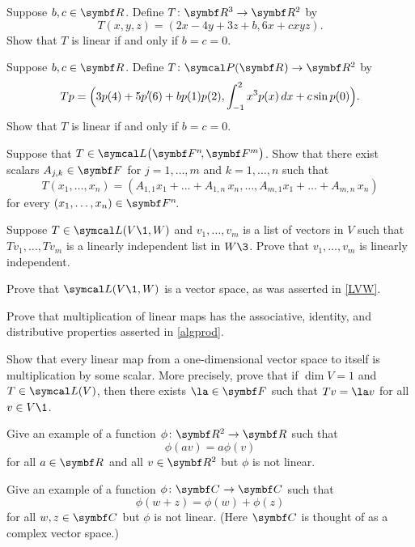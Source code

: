 \begin{exercises}

\exercise
Suppose $b, c \in \R{}$. Define $T \colon \R3 \to \R2$ by
\[
T(x, y, z) = (2x -4y + 3z + b, 6x + c xyz).
\]
Show that $T$ is linear if and only if $b = c = 0$.


\exercise
Suppose $b, c \in \R{}$. Define $T \colon \P(\R{}) \to \R2$ by
\[
Tp = \Bigl(3p(4) + 5p' \! (6) + b p(1) p(2), \int_{-1}^2 x^3 p(x)\, dx + c \sin p(0)\Bigr).
\]
Show that $T$ is linear if and only if $b = c = 0$.


\exercise
Suppose that $T \in \L\paren[\big]{\FF{n}, \F{m}}$.  Show that there exist scalars $A_{j, k} \in \F{}$ for $j = 1, \dots, m$ and $k = 1, \dots, n$ such that
\[
T(x_1, \dots, x_n) =
(A_{1,1}x_1 + \dots + A_{1,n}\,x_n, \dots, A_{m,1}x_1 + \dots + A_{m,n}\,x_n)
\]
for every $(x_1, \dots, x_n) \in \FF{n}$.


\exercise
Suppose $T \in \L(V\1, W)$ and $v_1, \dots, v_m$ is a list of vectors in $V$ such that
$Tv_1, \dots, Tv_m$ is a linearly independent list in $W\3$. Prove that $v_1, \dots, v_m$ is linearly independent.


\exercise
Prove that $\L(V\1,W)$ is a vector space, as was asserted in \ref{LVW}.


\exercise
Prove that multiplication of linear maps has the associative, identity, and distributive properties asserted in \ref{algprod}.


\exercise
Show that every linear map from a one-dimensional vector space to
itself is multiplication by some scalar.  More precisely, prove that
if $\dim V = 1$ and $T \in \L(V)$, then there exists $\la \in \F{}$ such
that $Tv = \la v$ for all $v \in V\1$. \label{dualone}


\exercise
Give an example of a function $\phi\colon \R{2} \to \R{}$ such that \label{403}
\[
\phi(av) = a \phi(v)
\]
for all $a \in \R{}$ and all $v \in \R{2}$ but $\phi$ is not linear.


\exercise
Give an example of a function $\phi \colon \C{} \to \C{}$ such that
\[
\phi(w + z) = \phi(w) + \phi(z)
\]
for all $w, z \in \C{}$ but $\phi$ is not linear. (Here $\C{}$ is thought of as a complex vector space.)


\end{exercises}
